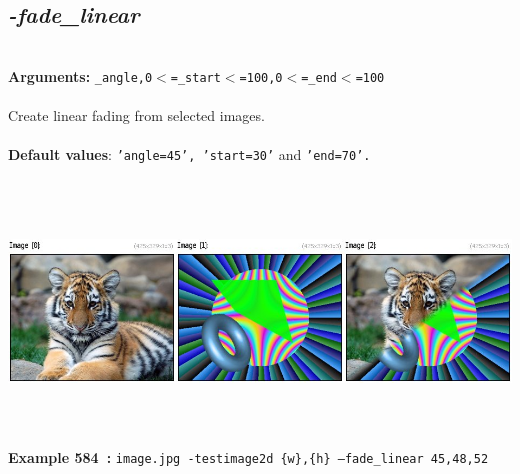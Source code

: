 \documentclass[a4paper,11pt,twoside]{book}
\begin{document}
\subsection{\emph{-fade\_linear} }\vspace*{-0.5em}
~\\\textbf{Arguments: } 
{\small \texttt{\_angle,0$<$=\_start$<$=100,0$<$=\_end$<$=100}}\\~\\
Create linear fading from selected images.
~\\~\\\textbf{Default values}: {\small \texttt{'angle=45', 'start=30'} and \texttt{'end=70'.}}
\begin{center}\includegraphics[keepaspectratio=true,height=7cm,width=\textwidth]{img/gmic_def584.jpg}\\
{\footnotesize \textbf{Example 584~:} \texttt{image.jpg -testimage2d \{w\},\{h\} --fade\_linear 45,48,52}}
\end{center}
\end{document}
